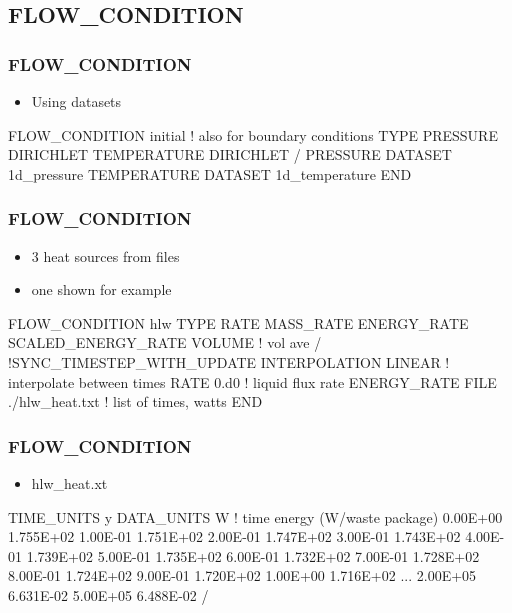 \documentclass{beamer}
\newcommand\bluecomment[1]{{{\color{blue} #1}}}
\begin{document}
\subsection{FLOW\_CONDITION}

\begin{frame}[fragile]\frametitle{FLOW\_CONDITION}
\begin{itemize}
  \item{Using datasets}
\end{itemize}

\begin{semiverbatim}
FLOW_CONDITION initial \bluecomment{! also for boundary conditions}
  TYPE
    PRESSURE DIRICHLET
    TEMPERATURE DIRICHLET
  /
  PRESSURE DATASET 1d_pressure
  TEMPERATURE DATASET 1d_temperature
END

\end{semiverbatim}
\end{frame}

\begin{frame}[fragile]\frametitle{FLOW\_CONDITION}
\begin{itemize}
  \item{3 heat sources from files}
  \item{one shown for example}
\end{itemize}

\begin{semiverbatim}
FLOW_CONDITION hlw
  TYPE
    RATE MASS_RATE
    ENERGY_RATE SCALED_ENERGY_RATE VOLUME \bluecomment{! vol ave}
  /
  \bluecomment{!SYNC_TIMESTEP_WITH_UPDATE}
  INTERPOLATION LINEAR \bluecomment{! interpolate between times}
  RATE 0.d0 \bluecomment{! liquid flux rate}
  ENERGY_RATE FILE ./hlw_heat.txt \bluecomment{! list of times, watts}
END

\end{semiverbatim}
\end{frame}

\begin{frame}[fragile]\frametitle{FLOW\_CONDITION}
\begin{itemize}
  \item{hlw\_heat.xt}
\end{itemize}

\begin{semiverbatim}\small
TIME_UNITS y
DATA_UNITS W
\bluecomment{! time energy (W/waste package)}
0.00E+00        1.755E+02
1.00E-01        1.751E+02
2.00E-01        1.747E+02
3.00E-01        1.743E+02
4.00E-01        1.739E+02
5.00E-01        1.735E+02
6.00E-01        1.732E+02
7.00E-01        1.728E+02
8.00E-01        1.724E+02
9.00E-01        1.720E+02
1.00E+00        1.716E+02
\bluecomment{...}
2.00E+05        6.631E-02
5.00E+05        6.488E-02
/
\end{semiverbatim}
\end{frame}
\end{document}
